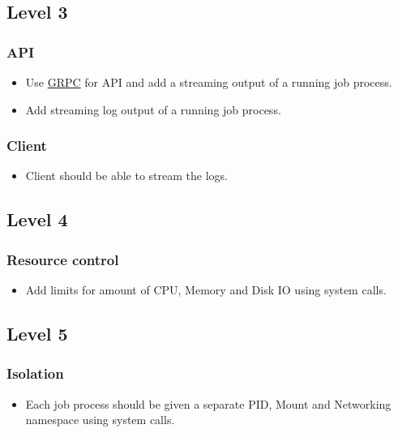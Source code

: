 \documentclass{article}
\begin{document}
 \subsection*{Level 3}
    
  \subsubsection*{API}
  \begin{itemize} 
  \item[] Use \href{https://grpc.io}{GRPC} for API and add a streaming output of a running job process.
  \item[] Add streaming log output of a running job process.
  \end{itemize}

  \subsubsection*{Client}
  \begin{itemize} 
  \item[] Client should be able to stream the logs.
  \end{itemize}
  
  \subsection*{Level 4}
    
  \subsubsection*{Resource control}
  \begin{itemize}
  \item[] Add limits for amount of CPU, Memory and Disk IO using system calls.
  \end{itemize}

  \subsection*{Level 5}
    
  \subsubsection*{Isolation}
  \begin{itemize}
  \item[] Each job process should be given a separate PID, Mount and Networking namespace using system calls.
  \end{itemize}
\end{document}
